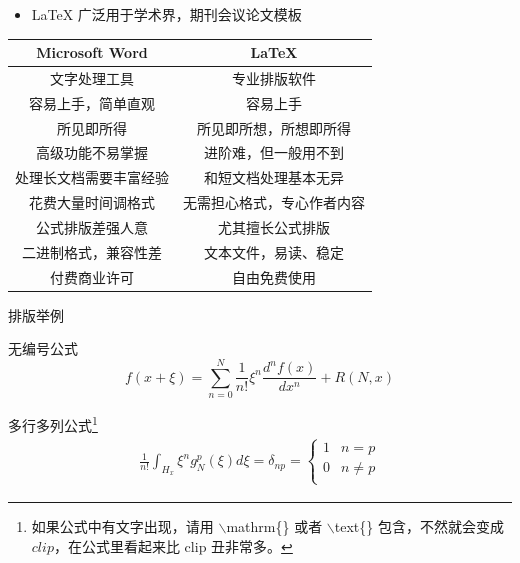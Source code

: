 \documentclass{beamer}
\begin{document}
	\begin{frame}
    	\begin{itemize}
    	    \item \LaTeX{} 广泛用于学术界，期刊会议论文模板
    	\end{itemize}
        \begin{table}[h]
    		\centering
    		\begin{tabular}{c|c}
    			Microsoft Word & \LaTeX{} \\
    			\hline
    			文字处理工具 & 专业排版软件 \\
    			容易上手，简单直观 & 容易上手 \\
    			所见即所得 & 所见即所想，所想即所得 \\
    			高级功能不易掌握 & 进阶难，但一般用不到 \\
    			处理长文档需要丰富经验 & 和短文档处理基本无异 \\
    			花费大量时间调格式 & 无需担心格式，专心作者内容 \\
    			公式排版差强人意 & 尤其擅长公式排版 \\
    			二进制格式，兼容性差 & 文本文件，易读、稳定 \\
    			付费商业许可 & 自由免费使用 \\
    		\end{tabular}
    	\end{table}
    \end{frame}
	
    \begin{frame}{排版举例}
	    \begin{exampleblock}{无编号公式} %
    		\begin{equation*}
    		f(x+\xi)=\sum_{n=0}^{N}\frac{1}{n!}\xi^n\frac{d^nf(x)}{dx^n}+R(N,x) 
    		\label{equ-1}
    		\end{equation*}
    	\end{exampleblock}
	
    	\begin{exampleblock}{多行多列公式\footnote{\tiny {如果公式中有文字出现，请用 $\backslash$mathrm\{\} 或者 $\backslash$text\{\} 包含，不然就会变成 $clip$，在公式里看起来比 $\mathrm{clip}$ 丑非常多。}}}
    		\begin{align}
    		    \frac{1}{n!}\int_{H_x}\xi^ng_N^p(\xi)d\xi=\delta_{np}=
    		    \begin{cases}
    			1 & n=p\\
    			0 & n\neq p\\
    		    \end{cases}
    	    	\label{equ-2}
    		\end{align}
    	\end{exampleblock}
    \end{frame}
	
\end{document}
